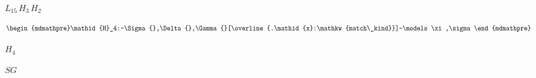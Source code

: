 \documentclass[10pt]{book}
\begin{document}
\begin{mdSnippets}
\begin{mdDisplaySnippet}[4018b6ba027c0e04fc20ff6b230e3327]
\[\]%
\end{mdDisplaySnippet}%
\begin{mdInlineSnippet}[7386038e6ca5b49ce88b9b9edb1df714]%
$L_{15} \, H_3 \, H_2$\end{mdInlineSnippet}%
\begin{mdDisplaySnippet}[dc21c2cae446c0b098cd16d1b3975285]%
\[%
\begin{mdmathpre}%
\mathid{H}_4:~\Sigma{},\Delta{},\Gamma{}[\overline{.\mathid{x}:\mathkw{match\_kind}}]~\models \xi,\sigma
\end{mdmathpre}%
\]%
\end{mdDisplaySnippet}%
\begin{mdInlineSnippet}%
$H_4$\end{mdInlineSnippet}%
\begin{mdInlineSnippet}[0f177369a3b71275d25ab1b44db9f95f]%
$SG$\end{mdInlineSnippet}%

\end{mdSnippets}
\end{document}

